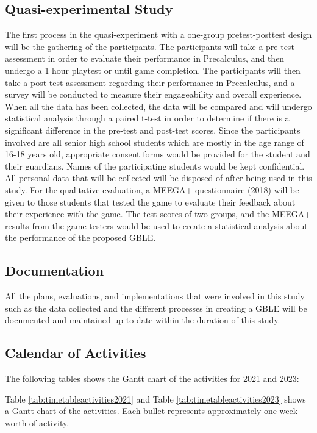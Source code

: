 \begin{subs}
\subsection{Quasi-experimental Study}
The first process in the quasi-experiment with a one-group pretest-posttest design will be the gathering of the participants. The participants will take a pre-test assessment in order to evaluate their performance in Precalculus, and then undergo a 1 hour playtest or until game completion. The participants will then take a post-test assessment regarding their performance in Precalculus, and a survey will be conducted to measure their engageability and overall experience. When all the data has been collected, the data will be compared and will undergo statistical analysis through a paired t-test in order to determine if there is a significant difference in the pre-test and post-test scores.
Since the participants involved are all senior high school students which are mostly in the age range of 16-18 years old, appropriate consent forms would be provided for the student and their guardians. Names of the participating students would be kept confidential. All personal data that will be collected will be disposed of after being used in this study.
For the qualitative evaluation, a MEEGA+ questionnaire (2018) will be given to those students that tested the game to evaluate their feedback about their experience with the game. The test scores of two groups, and the MEEGA+ results from the game testers would be used to create a statistical analysis about the performance of the proposed GBLE.
\subsection{Documentation}
All the plans, evaluations, and implementations that were involved in this study such as the data collected and the different processes in creating a GBLE will be documented and maintained up-to-date within the duration of this study.
\subsection{Calendar of Activities}
The following tables shows the Gantt chart of the activities for 2021 and 2023:

Table \ref{tab:timetableactivities2021} and Table \ref{tab:timetableactivities2023} shows a Gantt chart of the activities.  Each bullet represents approximately one week worth of activity.

%
%
\newcommand{\weekone}{\textbullet}
\newcommand{\weektwo}{\textbullet \textbullet}
\newcommand{\weekthree}{\textbullet \textbullet \textbullet}
\newcommand{\weekfour}{\textbullet \textbullet \textbullet \textbullet}


\end{subs}

